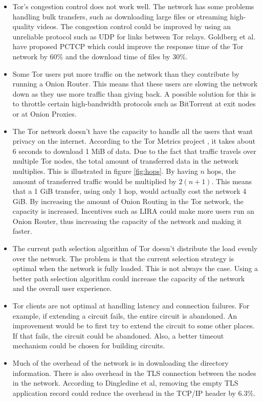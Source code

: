 \documentclass{article}
\begin{document}
		\begin{itemize}
			\item Tor's congestion control does not work well. The network has some problems handling bulk transfers, such as downloading large files or streaming high-quality videos. The congestion control could be improved by using an unreliable protocol such as UDP for links between Tor relays. Goldberg et al. \cite{alsabah2013pctcp} have proposed PCTCP which could improve the response time of the Tor network by 60\% and the download time of files by 30\%.	
		
			\item Some Tor users put more traffic on the network than they contribute by running a Onion Router. This means that these users are slowing the network down as they use more traffic than giving back. A possible solution for this is to throttle certain high-bandwidth protocols such as BitTorrent at exit nodes or at Onion Proxies.
		
			\item The Tor network doesn't have the capacity to handle all the users that want privacy on the internet. According to the Tor Metrics project \cite{tormetricsprojectwebsite}, it takes about 6 seconds to download 1 MiB of data. Due to the fact that traffic travels over multiple Tor nodes, the total amount of transferred data in the network multiplies. This is illustrated in figure \ref{fig:hops}. By having $n$ hops, the amount of transferred traffic would be multiplied by $2(n+1)$. This means that a 1 GiB transfer, using only 1 hop, would actually cost the network 4 GiB. By increasing the amount of Onion Routing in the Tor network, the capacity is increased. Incentives such as LIRA \cite{jansen13lira} could make more users run an Onion Router, thus increasing the capacity of the network and making it faster.	
		
			\item The current path selection algorithm of Tor doesn't distribute the load evenly over the network. The problem is that the current selection strategy is optimal when the network is fully loaded. This is not always the case. Using a better path selection algorithm could increase the capacity of the network and the overall user experience.		
		
			\item Tor clients are not optimal at handling latency and connection failures. For example, if extending a circuit fails, the entire circuit is abandoned. An improvement would be to first try to extend the circuit to some other places. If that fails, the circuit could be abandoned. Also, a better timeout mechanism could be chosen for building circuits.
			
			\item Much of the overhead of the network is in downloading the directory information. There is also overhead in the TLS connection between the nodes in the network. According to Dingledine et al, removing the empty TLS application record could reduce the overhead in the TCP/IP header by 6.3\%.	
		\end{itemize}
		
\end{document}
